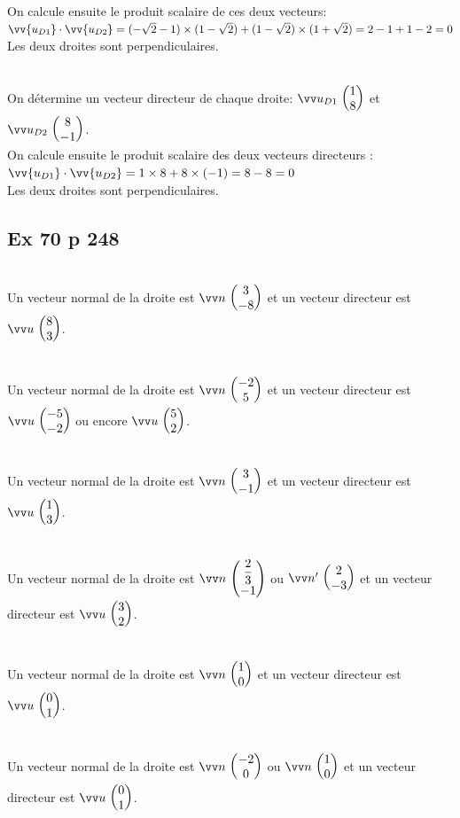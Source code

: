 \documentclass[12pt,a4paper]{book}
\begin{document}
\begin{enumMet}
On calcule ensuite le produit scalaire de ces deux vecteurs:\\
$\vv{u_{D 1}} \cdot \vv{u_{D 2}}=(-\sqrt{2}-1) \times(1-\sqrt{2})+(1-\sqrt{2}) \times(1+\sqrt{2})=2-1+1-2=0$\\
Les deux droites sont perpendiculaires.
\item  {}\\
On détermine un vecteur directeur de chaque droite: $\Coord{u_{D1}}{1}{8}$ et $\Coord{u_{D2}}{8}{-1}$.\\
On calcule ensuite le produit scalaire des deux vecteurs directeurs :\\
$\vv{u_{D 1}} \cdot \vv{u_{D 2}}=1 \times 8+8 \times(-1)=8-8=0$\\
Les deux droites sont perpendiculaires.
\end{enumMet}

\subsection*{Ex 70 p 248}
\begin{enumMet}
    \item {}\\
    Un vecteur normal de la droite est $\Coord{n}{3}{-8}$ et un vecteur directeur est $\Coord{u}{8}{3}$.
    \item {}\\
    Un vecteur normal de la droite est $\Coord{n}{-2}{5}$ et un vecteur directeur est $\Coord{u}{-5}{-2}$ ou encore $\Coord{u}{5}{2}$.
    \item {}\\
    Un vecteur normal de la droite est $\Coord{n}{3}{-1}$ et un vecteur directeur est $\Coord{u}{1}{3}$.
    \item {}\\
    Un vecteur normal de la droite est $\Coord{n}{\dfrac{2}{3}}{-1}$ ou $\Coord{n'}{2}{-3}$ et un vecteur directeur est $\Coord{u}{3}{2}$.
    \item {}\\
    Un vecteur normal de la droite est $\Coord{n}{1}{0}$ et un vecteur directeur est $\Coord{u}{0}{1}$.
    \item {}\\
    Un vecteur normal de la droite est $\Coord{n}{-2}{0}$ ou $\Coord{n}{1}{0}$ et un vecteur directeur est $\Coord{u}{0}{1}$.
\end{enumMet}
\end{document}
